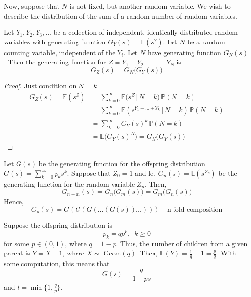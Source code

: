     Now, suppose that $N$ is not fixed, but another random variable. We wish to describe the distribution of the sum of a random number of random variables. 

    \begin{lemma}
      Let $Y_1, Y_2, Y_3, ...$ be a collection of independent, identically distributed random variables with generating function $G_Y (s) = \mathbb{E}(s^Y)$. Let $N$ be a random counting variable, independent of the $Y_i$. Let $N$ have generating function $G_N (s)$. Then the generating function for $Z = Y_1 + Y_2 + ... + Y_N$ is 
      \begin{equation}
        G_Z (s) = G_N \big( G_Y (s) \big)
      \end{equation}
    \end{lemma}
    \begin{proof}
      Just condition on $N = k$ 
      \begin{align*}
        G_Z (s) = \mathbb{E}(s^Z) & = \sum_{k=0}^\infty \mathbb{E}\big( s^Z \,|\, N=k\big) \, \mathbb{P}(N=k) \\
        & = \sum_{k=0}^\infty \mathbb{E}(s^{Y_1 + ... + Y_k} \,|\,N=k) \, \mathbb{P}(N=k) \\
        & = \sum_{k=0}^\infty G_Y (s)^k \, \mathbb{P}(N=k) \\
        & = \mathbb{E}\big( G_Y (s)^N \big) = G_N \big( G_Y (s) \big)
      \end{align*}
    \end{proof}

    \begin{theorem}
      Let $G(s)$ be the generating function for the offspring distribution $G(s) = \sum_{k=0}^\infty p_k s^k$. Suppose that $Z_0 = 1$ and let $G_n (s) = \mathbb{E}(s^{Z_n})$ be the generating function for the random variable $Z_n$. Then, 
      \begin{equation}
        G_{n+m} (s) = G_n \big(G_m (s)\big) = G_m \big( G_n (s) \big)
      \end{equation}
      Hence, 
      \begin{equation}
        G_n (s) = G(G(G(...(G(s))...))) \;\;\;\; \text{n-fold composition}
      \end{equation}
    \end{theorem}

    \begin{example}
      Suppose the offspring distribution is
      \begin{equation}
        p_k = q p^k, \;\; k \geq 0
      \end{equation}
      for some $p \in (0, 1)$, where $q = 1-p$. Thus, the number of children from a given parent is $Y = X - 1$, where $X \sim$ Geom$(q)$. Then, $\mathbb{E}(Y) = \frac{1}{q} - 1 = \frac{p}{q}$. With some computation, this means that
      \begin{equation}
        G(s) = \frac{q}{1- p s}
      \end{equation}
      and $t = \min \{1, \frac{q}{p}\}$. 
    \end{example}

